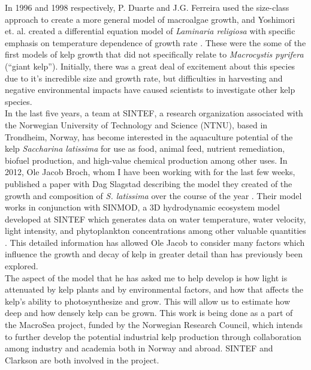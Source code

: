 In 1996 and 1998 respectively, P. Duarte and J.G. Ferreira used the size-class approach to create a more general model of macroalgae growth, and Yoshimori et. al. created a differential equation model of \textit{Laminaria religiosa} with specific emphasis on temperature dependence of growth rate \cite{duarte_model_1996,yoshimori_mathematical_1998}.
These were the some of the first models of kelp growth that did not specifically relate to \textit{Macrocystis pyrifera} (``giant kelp''). 
Initially, there was a great deal of excitement about this species due to it's incredible size and growth rate, but difficulties in harvesting and negative environmental impacts have caused scientists to investigate other kelp species. \\[-0.75em]

In the last five years, a team at SINTEF, a research organization associated with the Norwegian University of Technology and Science (NTNU), based in Trondheim, Norway, has become interested in the aquaculture potential of the kelp \textit{Saccharina latissima} for use as food, animal feed, nutrient remediation, biofuel production, and high-value chemical production among other uses. 
In 2012, Ole Jacob Broch, whom I have been working with for the last few weeks, published a paper with Dag Slagstad describing the model they created of the growth and composition of \textit{S. latissima} over the course of the year \cite{broch_modelling_2012}.
Their model works in conjunction with SINMOD, a 3D hydrodynamic ecosystem model developed at SINTEF which generates data on water temperature, water velocity, light intensity, and phytoplankton concentrations among other valuable quantities \cite{wassmann_modelling_2006}.
This detailed information has allowed Ole Jacob to consider many factors which influence the growth and decay of kelp in greater detail than has previously been explored. \\[-0.75em]

The aspect of the model that he has asked me to help develop is how light is attenuated by kelp plants and by environmental factors, and how that affects the kelp's ability to photosynthesize and grow. 
This will allow us to estimate how deep and how densely kelp can be grown. This work is being done as a part of the MacroSea project, funded by the Norwegian Research Council, which intends to further develop the potential industrial kelp production through collaboration among industry and academia both in Norway and abroad. SINTEF and Clarkson are both involved in the project. \\[-0.75em]

